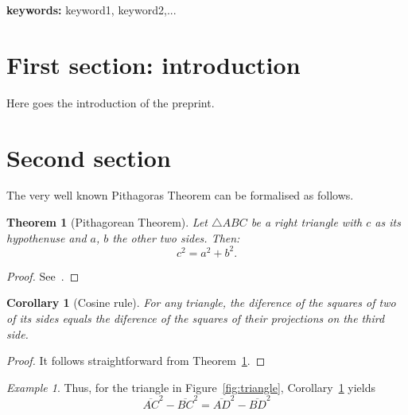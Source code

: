 \documentclass[10pt,twoside]{article}
\newtheorem{thm}{Theorem}
\newtheorem{cor}{Corollary}
\theoremstyle{remark}
\newtheorem{example}{Example}
\theoremstyle{definition}
\begin{document}
\textbf{keywords:} keyword1, keyword2,...

\tableofcontents

\section{First section: introduction}\label{sec:1stSection}
\noindent Here goes the introduction of the preprint.

\section{Second section}\label{sec:2ndSection}
\noindent 
The very well known Pithagoras Theorem can be formalised as follows.


\begin{thm}[Pithagorean Theorem]\label{teor:Pithagoras}
	Let $\bigtriangleup\!ABC$ be a right triangle with $c$ as its
	hypothenuse and $a$, $b$ the other two sides. Then: 
	\begin{displaymath}
		c^{2} = a^{2} + b^{2}.
	\end{displaymath}	
\end{thm}

\begin{proof}
	See~\cite{Loomis_ElisaS68}.
\end{proof}

\begin{cor}[Cosine rule]\label{cor:cosRule}
	For any triangle, the diference of the squares of two of its sides
	equals the diference of the squares of their projections on the third
	side.
\end{cor}

\begin{proof}
	It follows straightforward from Theorem~\ref{teor:Pithagoras}. 
\end{proof}

\begin{example}
Thus, for the triangle in Figure~\ref{fig:triangle},
Corollary~\ref{cor:cosRule} yields
\begin{equation}
	\overline{AC}^{2} - \overline{BC}^{2} = \overline{AD}^{2} 
	- \overline{BD}^{2}
\end{equation}
\end{example}
\end{document}
